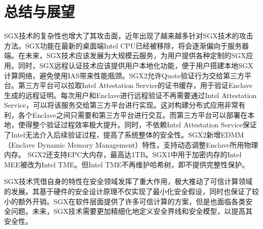 \documentclass[twocolumn]{source/Paper}
\begin{document}
    \section{总结与展望}

        SGX技术的复杂性也增大了其攻击面，近年出现了越来越多针对SGX技术的攻击方法。SGX功能在最新的桌面端Intel CPU已经被移除，将会逐渐偏向于服务器端。在未来，SGX技术应该发展为大规模云服务，为用户提供各种定制的SGX应用。同时，SGX远程认证技术应该提供用户本地化功能，便于用户搭建本地SGX计算网络，避免使用IAS带来性能瓶颈。SGX2允许Quote验证行为交给第三方平台。第三方平台可以拉取Intel Attestation Service的证书缓存，用于验证Enclave生成的远程证明。每次用户和Enclave进行远程验证不再需要通过Intel Attestation Service，可以将该服务交给第三方平台进行实现。这对构建分布式应用非常有利，各个Enclave之间只需要和第三方平台进行交互。而第三方平台可以部署在本地，使得整个验证过程效率极大提升。同时，不依赖Intel Attestation Service保证了Intel无法介入后续验证过程，提高了系统整体的安全性。SGX2新增EDMM（Enclave Dynamic Memory Management）特性，支持动态调整Enclave所用物理内存。
        SGX2还支持EPC大内存，最高达1TB。SGX1中用于加密内存的Intel MEE被改为Intel TME。但Intel TME不再维护哈希树，即不提供完整性保护。

        SGX技术凭借自身的特性在安全领域发挥了重大作用，极大推动了可信计算领域的发展。其基于硬件的安全设计原理不仅实现了最小化安全假设，同时也保证了较小的额外开销。SGX在软件层面提供了许多可信计算的方案，但是也面临各类安全问题。未来，SGX技术需要更加精细化地定义安全界线和安全模型，以提高其安全性。
    
    \newpage
    
    
\end{document}
